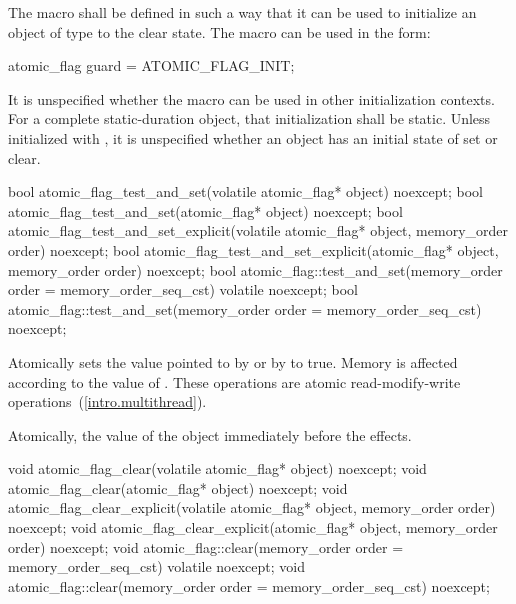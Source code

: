 \pnum
The macro  shall be defined in such a way that it can be used to initialize an object of type  to the
clear state. The macro can be used in the form:
\begin{codeblock}
atomic_flag guard = ATOMIC_FLAG_INIT;
\end{codeblock}
It is unspecified whether the macro can be used in other initialization contexts.
For a complete static-duration object, that initialization shall be static.
Unless initialized with , it is unspecified whether an
 object has an initial state of set or clear.

%
%
\begin{itemdecl}
bool atomic_flag_test_and_set(volatile atomic_flag* object) noexcept;
bool atomic_flag_test_and_set(atomic_flag* object) noexcept;
bool atomic_flag_test_and_set_explicit(volatile atomic_flag* object, memory_order order) noexcept;
bool atomic_flag_test_and_set_explicit(atomic_flag* object, memory_order order) noexcept;
bool atomic_flag::test_and_set(memory_order order = memory_order_seq_cst) volatile noexcept;
bool atomic_flag::test_and_set(memory_order order = memory_order_seq_cst) noexcept;
\end{itemdecl}

\begin{itemdescr}
\pnum
\effects Atomically sets the value pointed to by  or by  to true. Memory is affected according to the value of
. These operations are atomic read-modify-write operations~(\ref{intro.multithread}).

\pnum
\returns Atomically, the value of the object immediately before the effects.
\end{itemdescr}

%
%
%
%
\begin{itemdecl}
void atomic_flag_clear(volatile atomic_flag* object) noexcept;
void atomic_flag_clear(atomic_flag* object) noexcept;
void atomic_flag_clear_explicit(volatile atomic_flag* object, memory_order order) noexcept;
void atomic_flag_clear_explicit(atomic_flag* object, memory_order order) noexcept;
void atomic_flag::clear(memory_order order = memory_order_seq_cst) volatile noexcept;
void atomic_flag::clear(memory_order order = memory_order_seq_cst) noexcept;
\end{itemdecl}

